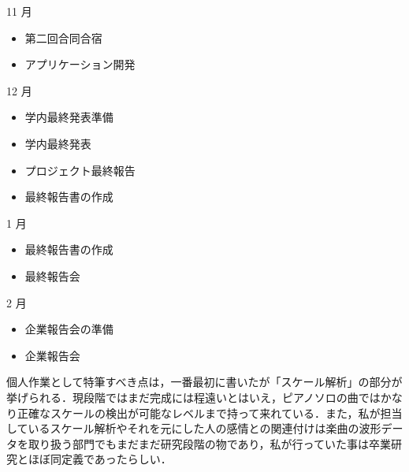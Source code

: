 11 月
\begin{itemize}
\item 第二回合同合宿
\item アプリケーション開発
\end{itemize}
12 月
\begin{itemize}
\item 学内最終発表準備
\item 学内最終発表
\item プロジェクト最終報告
\item 最終報告書の作成
\end{itemize}
1 月
\begin{itemize}
\item 最終報告書の作成
\item 最終報告会
\end{itemize}
2 月
\begin{itemize}
\item 企業報告会の準備
\item 企業報告会
\end{itemize}
個人作業として特筆すべき点は，一番最初に書いたが「スケール解析」の部分が挙げられる．現段階ではまだ完成には程遠いとはいえ，ピアノソロの曲ではかなり正確なスケールの検出が可能なレベルまで持って来れている．また，私が担当しているスケール解析やそれを元にした人の感情との関連付けは楽曲の波形データを取り扱う部門でもまだまだ研究段階の物であり，私が行っていた事は卒業研究とほぼ同定義であったらしい．
